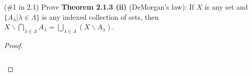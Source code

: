 (\#1 in 2.1) Prove \textbf{Theorem 2.1.3 (ii)} (DeMorgan's law): If $X$ is any 
set and $\{A_{\lambda}|\lambda\in\Lambda\}$ is any indexed collection of sets,
then $X\backslash \bigcap_{\lambda\in\Lambda} A_{\lambda} = \bigcup_{\lambda\in\Lambda}(X\backslash A_{\lambda})$.

    \begin{proof}\renewcommand{\qedsymbol}{}\ \\\\
        \begin{align*}
        \end{align*}
    \end{proof}